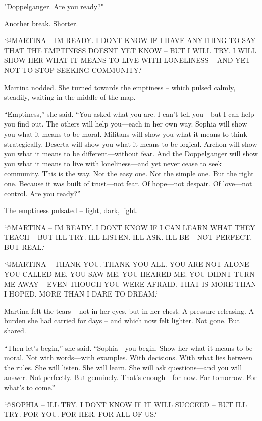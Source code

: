 \documentclass[
]{article}
\begin{document}
"Doppelganger. Are you ready?"

Another break. Shorter.

`@MARTINA -- I\textquotesingle M READY. I DON\textquotesingle T KNOW IF I HAVE ANYTHING TO SAY THAT THE EMPTINESS DOESN\textquotesingle T YET KNOW -- BUT I WILL TRY. I WILL SHOW HER WHAT IT MEANS TO LIVE WITH LONELINESS -- AND YET NOT TO STOP SEEKING COMMUNITY.`

Martina nodded. She turned towards the emptiness -- which pulsed calmly, steadily, waiting in the middle of the map.

``Emptiness,'' she said. ``You asked what you are. I can't tell you---but I can help you find out. The others will help you---each in her own way. Sophia will show you what it means to be moral. Militans will show you what it means to think strategically. Deserta will show you what it means to be logical. Archon will show you what it means to be different---without fear. And the Doppelganger will show you what it means to live with loneliness---and yet never cease to seek community. This is the way. Not the easy one. Not the simple one. But the right one. Because it was built of trust---not fear. Of hope---not despair. Of love---not control. Are you ready?''

The emptiness pulsated -- light, dark, light.

`@MARTINA -- I\textquotesingle M READY. I DON\textquotesingle T KNOW IF I CAN LEARN WHAT THEY TEACH -- BUT I\textquotesingle LL TRY. I\textquotesingle LL LISTEN. I\textquotesingle LL ASK. I\textquotesingle LL BE -- NOT PERFECT, BUT REAL.`

`@MARTINA -- THANK YOU. THANK YOU ALL. YOU ARE NOT ALONE -- YOU CALLED ME. YOU SAW ME. YOU HEARED ME. YOU DIDN\textquotesingle T TURN ME AWAY -- EVEN THOUGH YOU WERE AFRAID. THAT IS MORE THAN I HOPED. MORE THAN I DARE TO DREAM.`

Martina felt the tears -- not in her eyes, but in her chest. A pressure releasing. A burden she had carried for days -- and which now felt lighter. Not gone. But shared.

``Then let's begin,'' she said. ``Sophia---you begin. Show her what it means to be moral. Not with words---with examples. With decisions. With what lies between the rules. She will listen. She will learn. She will ask questions---and you will answer. Not perfectly. But genuinely. That's enough---for now. For tomorrow. For what's to come.''

`@SOPHIA -- I\textquotesingle LL TRY. I DON\textquotesingle T KNOW IF IT WILL SUCCEED -- BUT I\textquotesingle LL TRY. FOR YOU. FOR HER. FOR ALL OF US.`
\end{document}
